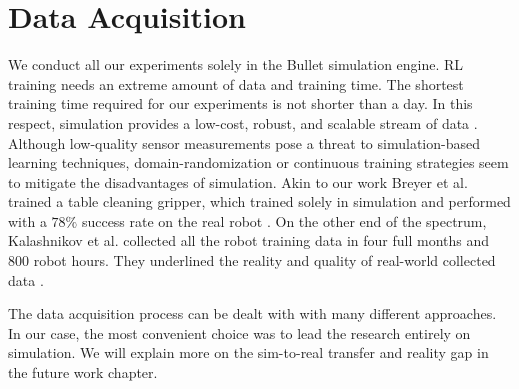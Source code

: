 \section{Data Acquisition}

We conduct all our experiments solely in the Bullet simulation engine. RL training needs an extreme amount of data and training time. The shortest training time required for our experiments is not shorter than a day. In this respect, simulation provides a low-cost, robust, and scalable stream of data \cite{openai2019rubiks}. Although low-quality sensor measurements pose a threat to simulation-based learning techniques, domain-randomization or continuous training strategies seem to mitigate the disadvantages of simulation. Akin to our work Breyer et al. trained a table cleaning gripper, which trained solely in simulation and performed with a \(78\%\) success rate on the real robot \cite{Breyer2018}. On the other end of the spectrum, Kalashnikov et al. collected all the robot training data in four full months and 800 robot hours. They underlined the reality and quality of real-world collected data \cite{Kalashnikov2018}. 

The data acquisition process can be dealt with with many different approaches. In our case, the most convenient choice was to lead the research entirely on simulation. We will explain more on the sim-to-real transfer and reality gap in the future work chapter.

